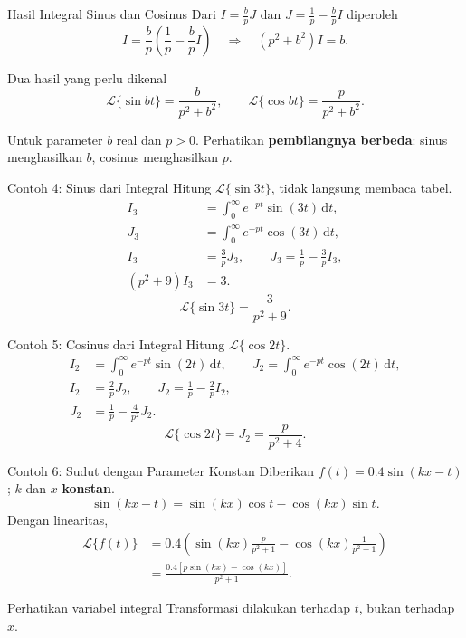 \documentclass[aspectratio=169,11pt]{beamer}
\newcommand{\Lap}{\mathcal{L}}
\newcommand{\dd}{\,\mathrm{d}}
\begin{document}
\begin{frame}{Hasil Integral Sinus dan Cosinus}
Dari $I=\frac bpJ$ dan $J=\frac1p-\frac bpI$ diperoleh
\[
I=\frac bp\left(\frac1p-\frac bp I\right)
\quad\Longrightarrow\quad (p^2+b^2)I=b.
\]
\begin{block}{Dua hasil yang perlu dikenal}
\[
\boxed{\Lap\{\sin bt\}=\frac{b}{p^2+b^2}},\qquad
\boxed{\Lap\{\cos bt\}=\frac{p}{p^2+b^2}}.
\]
\end{block}
\small Untuk parameter $b$ real dan $p>0$. Perhatikan \textbf{pembilangnya berbeda}: sinus menghasilkan $b$, cosinus menghasilkan $p$.
\end{frame}

\begin{frame}{Contoh 4: Sinus dari Integral}
Hitung $\Lap\{\sin 3t\}$, tidak langsung membaca tabel.
\[
\begin{aligned}
I_3&=\int_0^\infty e^{-pt}\sin(3t)\dd t,\\
J_3&=\int_0^\infty e^{-pt}\cos(3t)\dd t,\\
I_3&=\frac3pJ_3,\qquad J_3=\frac1p-\frac3p I_3,\\
(p^2+9)I_3&=3.
\end{aligned}
\]
\[
\boxed{\Lap\{\sin 3t\}=\frac3{p^2+9}.}
\]
\end{frame}

\begin{frame}{Contoh 5: Cosinus dari Integral}
Hitung $\Lap\{\cos 2t\}$.
\[
\begin{aligned}
I_2&=\int_0^\infty e^{-pt}\sin(2t)\dd t,
\qquad J_2=\int_0^\infty e^{-pt}\cos(2t)\dd t,\\
I_2&=\frac2pJ_2,\qquad J_2=\frac1p-\frac2pI_2,\\
J_2&=\frac1p-\frac4{p^2}J_2.
\end{aligned}
\]
\[
\boxed{\Lap\{\cos2t\}=J_2=\frac{p}{p^2+4}.}
\]
\end{frame}

\begin{frame}{Contoh 6: Sudut dengan Parameter Konstan}
Diberikan $f(t)=0.4\sin(kx-t)$; $k$ dan $x$ \textbf{konstan}.
\[
\sin(kx-t)=\sin(kx)\cos t-\cos(kx)\sin t.
\]
Dengan linearitas,
\[
\begin{aligned}
\Lap\{f(t)\}
&=0.4\left(\sin(kx)\frac{p}{p^2+1}
-\cos(kx)\frac1{p^2+1}\right)\\
&=\boxed{\frac{0.4[p\sin(kx)-\cos(kx)]}{p^2+1}}.
\end{aligned}
\]
\begin{alertblock}{Perhatikan variabel integral}
Transformasi dilakukan terhadap $t$, bukan terhadap $x$.
\end{alertblock}
\end{frame}
\end{document}
